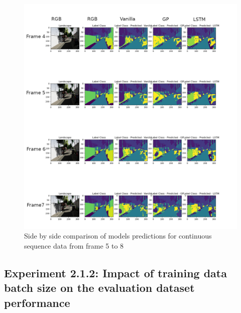 	\begin{figure}
		\centering
		\includegraphics[width=19cm]{images/continuous_sequence_data2.png}
		\caption{Side by side comparison of models predictions for continuous sequence data from frame 5 to 8}
		\label{fig:performance_metric_three_classes}
	\end{figure}

	\subsection{Experiment 2.1.2: Impact of training data batch size on the evaluation dataset performance}
	
